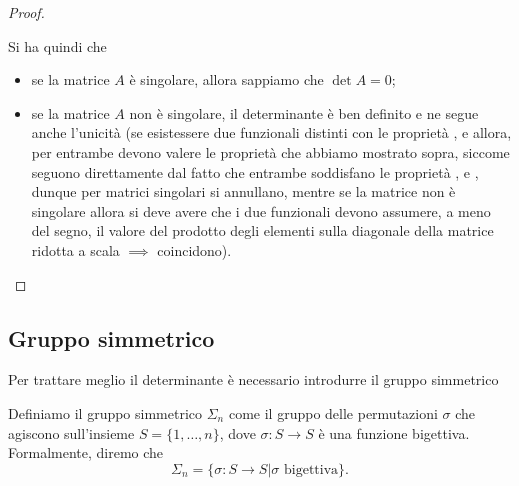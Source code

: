 \begin{proof}
\begin{enumerate}
\begin{itemize}
        \end{itemize}
        Si ha quindi che
        \begin{itemize}
            \item se la matrice $A$ è singolare, allora sappiamo che $\det{A} = 0$;
            \item se la matrice $A$ non è singolare, il determinante è ben definito e ne segue anche l'unicità (se esistessere due funzionali distinti con le proprietà ,  e  allora, per entrambe devono valere le proprietà che abbiamo mostrato sopra, siccome seguono direttamente dal fatto che entrambe soddisfano le proprietà ,  e , dunque per matrici singolari si annullano, mentre se la matrice non è singolare allora si deve avere che i due funzionali devono assumere, a meno del segno, il valore del prodotto degli elementi sulla diagonale della matrice ridotta a scala $\implies$ coincidono).
        \end{itemize}        
    \end{enumerate}
\end{proof}
\subsection{Gruppo simmetrico}

Per trattare meglio il determinante è necessario introdurre il gruppo simmetrico
\begin{definition}
    Definiamo il gruppo simmetrico $\Sigma_n$ come il gruppo delle permutazioni $\sigma$ che agiscono sull'insieme $S = \{1, \ldots, n \}$, dove $\sigma: S \to S$ è una funzione bigettiva. Formalmente, diremo che
    $$
        \Sigma_n = \{ \sigma: S \to S | \sigma \text{ bigettiva} \}.
    $$
\end{definition}

